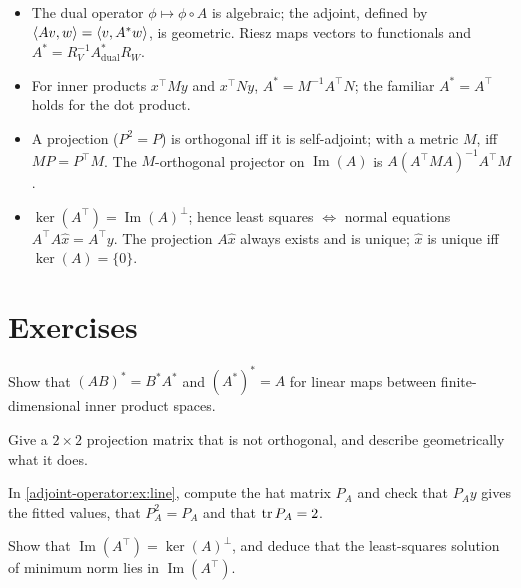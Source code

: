 \begin{notechapter}
\begin{chaptersummary}
\begin{itemize}[nosep]
  \item The dual operator $\phi\mapsto\phi\circ A$ is algebraic; the adjoint, defined by
        $\left\langle Av, w \right\rangle = \left\langle v, A^*w \right\rangle$, is geometric. Riesz maps vectors to functionals and
        $A^* = R_V^{-1}A^*_{\text{dual}}R_W$.
  \item For inner products $x^\top My$ and $x^\top Ny$, $A^* = M^{-1}A^\top N$; the familiar
        $A^* = A^\top$ holds for the dot product.
  \item A projection ($P^2 = P$) is orthogonal iff it is self-adjoint; with a metric $M$,
        iff $MP = P^\top M$. The $M$-orthogonal projector on $\operatorname{Im}(A)$ is
        $A(A^\top MA)^{-1}A^\top M$.
  \item $\ker(A^\top) = \operatorname{Im}(A)^\perp$; hence least squares $\iff$ normal equations
        $A^\top A\hat x = A^\top y$. The projection $A\hat x$ always exists and is unique;
        $\hat x$ is unique iff $\ker(A) = \{0\}$.
\end{itemize}
\end{chaptersummary}

\section*{Exercises}

\begin{exercise}\label{adjoint-operator:exr:1}
Show that $(AB)^* = B^*A^*$ and $(A^*)^* = A$ for linear maps between finite-dimensional
inner product spaces.
\end{exercise}

\begin{exercise}\label{adjoint-operator:exr:2}
Give a $2\times2$ projection matrix that is not orthogonal, and describe geometrically
what it does.
\end{exercise}

\begin{exercise}\label{adjoint-operator:exr:3}
In \cref{adjoint-operator:ex:line}, compute the hat matrix $P_A$ and check that
$P_Ay$ gives the fitted values, that $P_A^2 = P_A$ and that $\operatorname{tr} P_A = 2$.
\end{exercise}

\begin{exercise}\label{adjoint-operator:exr:4}
Show that $\operatorname{Im}(A^\top) = \ker(A)^\perp$, and deduce that the
least-squares solution of minimum norm lies in $\operatorname{Im}(A^\top)$.
\end{exercise}
\end{notechapter}
